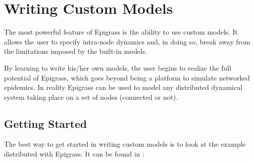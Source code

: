 \documentclass[a4paper,10pt,english]{sphinxmanual}
\begin{document}
\chapter{Writing Custom Models}
\label{scripting::doc}\label{scripting:custom}\label{scripting:writing-custom-models}
The most powerful feature of Epigrass is the ability to use custom
models. It allows the user to specify intra-node dynamics and, in
doing so, break away from the limitations imposed by the built-in
models.

By learning to write his/her own models, the user begins to realize
the full potential of Epigrass, which goes beyond being a platform to
simulate networked epidemics. In reality Epigrass can be used to model
any distributed dynamical system taking place on a set of nodes
(connected or not).


\section{Getting Started}
\label{scripting:getting-started}
The best way to get started in writing custom models is to look at the
example distributed with Epigrass. It can be found in
:
\end{document}
